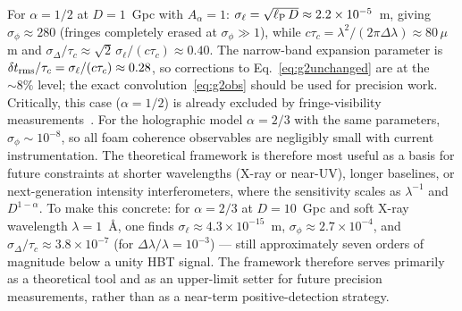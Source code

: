 \label{sec:conclusions}
For $\alpha=1/2$ at $D=1$~Gpc with $A_\alpha=1$:
$\sigma_\ell = \sqrt{\ell_{\rm P}\,D} \approx 2.2\times10^{-5}$~m,
giving $\sigma_\phi \approx 280$ (fringes completely erased at $\sigma_\phi\gg 1$),
while $c\tau_c = \lambda^2/(2\pi\Delta\lambda) \approx 80\,\mu$m and
$\sigma_\Delta/\tau_c \approx \sqrt{2}\,\sigma_\ell/(c\tau_c) \approx 0.40$.
The narrow-band expansion parameter is
$\delta t_{\rm rms}/\tau_c = \sigma_\ell/(c\tau_c) \approx 0.28$,
so corrections to Eq.~\eqref{eq:g2unchanged} are at the $\sim 8\%$ level;
the exact convolution~\eqref{eq:g2obs} should be used for precision work.
Critically, this case ($\alpha=1/2$) is already excluded by fringe-visibility
measurements~\cite{Perlman2015,Christiansen2011,2003ApJ...587L...1R}.
For the holographic model $\alpha=2/3$ with the same parameters, $\sigma_\phi\sim 10^{-8}$,
so all foam coherence observables are negligibly small with current instrumentation.
The theoretical framework is therefore most useful as a basis for future constraints
at shorter wavelengths (X-ray or near-UV), longer baselines, or next-generation
intensity interferometers, where the sensitivity scales as $\lambda^{-1}$ and $D^{1-\alpha}$.
To make this concrete: for $\alpha=2/3$ at $D=10$~Gpc and soft X-ray wavelength
$\lambda=1$~\AA, one finds $\sigma_\ell \approx 4.3\times10^{-15}$~m,
$\sigma_\phi \approx 2.7\times10^{-4}$, and
$\sigma_\Delta/\tau_c \approx 3.8\times10^{-7}$ (for $\Delta\lambda/\lambda=10^{-3}$) —
still approximately seven orders of magnitude below a unity HBT signal.
The framework therefore serves primarily as a theoretical tool and as an upper-limit
setter for future precision measurements, rather than as a near-term positive-detection
strategy.
